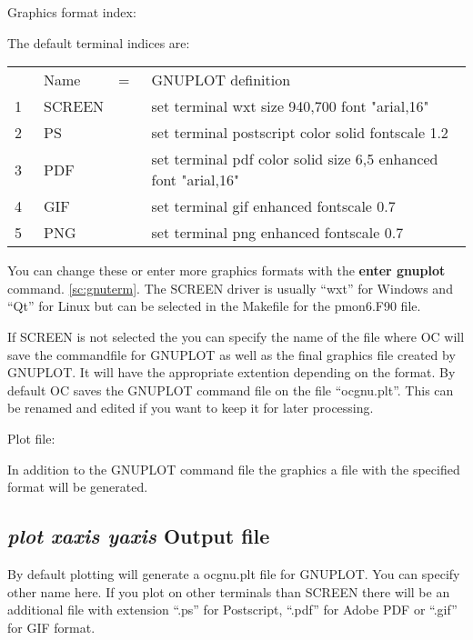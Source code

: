 \documentclass[11pt]{article}
\begin{document}
Graphics format index:

The default terminal indices are:

\begin{tabular}{rlcl}
  & Name   &=~ & GNUPLOT definition\\
 1~& SCREEN & & set terminal wxt size 940,700 font "arial,16"\\
 2~& PS     & & set terminal postscript color solid fontscale 1.2\\
 3~& PDF    & & set terminal pdf color solid size 6,5 enhanced font "arial,16"\\
 4~& GIF    & & set terminal gif enhanced fontscale 0.7\\
 5~& PNG    & & set terminal png enhanced fontscale 0.7\\
\end{tabular}

You can change these or enter more graphics formats with the {\bf
  enter gnuplot} command. \ref{sc:gnuterm}.  The SCREEN driver is
usually ``wxt'' for Windows and ``Qt'' for Linux but can be selected in
the Makefile for the pmon6.F90 file.

If SCREEN is not selected the you can specify the name of the file
where OC will save the commandfile for GNUPLOT as well as the final
graphics file created by GNUPLOT.  It will have the appropriate
extention depending on the format.  By default OC saves the GNUPLOT
command file on the file ``ocgnu.plt''.  This can be renamed and
edited if you want to keep it for later processing.

Plot file:

In addition to the GNUPLOT command file the graphics a file with the
specified format will be generated.

\hypertarget{Plot file}{}
\subsection{{\em plot xaxis yaxis} Output file}

By default plotting will generate a ocgnu.plt file for GNUPLOT.  You
can specify other name here.  If you plot on other terminals than
SCREEN there will be an additional file with extension ``.ps'' for
Postscript, ``.pdf'' for Adobe PDF or ``.gif'' for GIF format.
\end{document}
